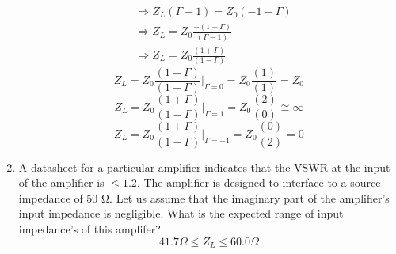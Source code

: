 \documentclass{article}
\begin{document}
\begin{enumerate}
\begin{align}
   &\Rightarrow Z_L(\Gamma - 1)  =  Z_0(-1 - \Gamma)\\
   &\Rightarrow Z_L  =  Z_0\frac{-(1 + \Gamma)}{(\Gamma - 1)}\\
   &\Rightarrow \boxed{Z_L  =  Z_0\frac{(1 + \Gamma)}{(1 - \Gamma)}}
   \end{align}
   \begin{equation}
       Z_L  =  Z_0\frac{(1 + \Gamma)}{(1 - \Gamma)}\bigg|_{\Gamma = 0} = Z_0\frac{(1)}{(1)} = Z_0
   \end{equation}
   \begin{equation}
       Z_L  =  Z_0\frac{(1 + \Gamma)}{(1 - \Gamma)}\bigg|_{\Gamma = 1}
       =  Z_0\frac{(2)}{(0)} \cong \infty
   \end{equation}
   \begin{equation}
       Z_L  =  Z_0\frac{(1 + \Gamma)}{(1 - \Gamma)}\bigg|_{\Gamma = -1}
       =  Z_0\frac{(0)}{(2)} = 0
   \end{equation}
   \item A datasheet for a particular amplifier indicates that the VSWR at the input of the amplifier is $\leq 1.2$. The amplifier is designed to interface to a source impedance of 50 Ω. Let us assume that the imaginary part of the amplifier’s input impedance is negligible. What is the expected range of input impedance's of this amplifer?
   \begin{equation}
       \boxed{41.7 \Omega \leq Z_L \leq 60.0\Omega}
   \end{equation}
\end{enumerate}
\end{document}

